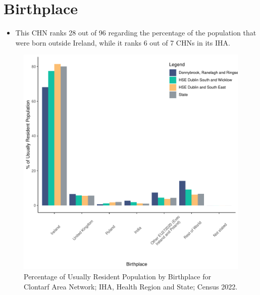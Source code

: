 \documentclass{article}
\begin{document}
\section{Birthplace}\label{sect:Birth}
\begin{itemize}
\item This CHN ranks  28 out of 96 regarding the percentage of the population that were born outside Ireland, while it ranks  6 out of 7 CHNs in its IHA.
\end{itemize}
\begin{figure}[H]
	\centering
	\includegraphics[width = 130mm]{../figures/BirthED.pdf}
	\caption{Percentage of Usually Resident Population by Birthplace for Clontarf Area Network; IHA, Health Region and State; Census 2022.}
	\label{fig:vbnv}
	\end{figure}
	
\end{document}

